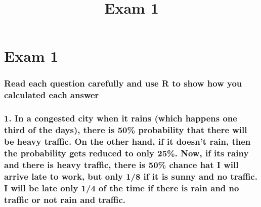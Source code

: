 \documentclass[11pt]{article}
\title{Exam 1}
\begin{document}
    
    
    \maketitle
    
    

    
    \hypertarget{exam-1}{%
\section{Exam 1}\label{exam-1}}

\hypertarget{read-each-question-carefully-and-use-r-to-show-how-you-calculated-each-answer}{%
\subsubsection{Read each question carefully and use R to show how you
calculated each
answer}\label{read-each-question-carefully-and-use-r-to-show-how-you-calculated-each-answer}}

    \hypertarget{in-a-congested-city-when-it-rains-which-happens-one-third-of-the-days-there-is-50-probability-that-there-will-be-heavy-traffic.-on-the-other-hand-if-it-doesnt-rain-then-the-probability-gets-reduced-to-only-25.-now-if-its-rainy-and-there-is-heavy-traffic-there-is-50-chance-hat-i-will-arrive-late-to-work-but-only-18-if-it-is-sunny-and-no-traffic.-i-will-be-late-only-14-of-the-time-if-there-is-rain-and-no-traffic-or-not-rain-and-traffic.}{%
\subsubsection{1. In a congested city when it rains (which happens one
third of the days), there is 50\% probability that there will be heavy
traffic. On the other hand, if it doesn't rain, then the probability
gets reduced to only 25\%. Now, if its rainy and there is heavy traffic,
there is 50\% chance hat I will arrive late to work, but only 1/8 if it
is sunny and no traffic. I will be late only 1/4 of the time if there is
rain and no traffic or not rain and
traffic.}\label{in-a-congested-city-when-it-rains-which-happens-one-third-of-the-days-there-is-50-probability-that-there-will-be-heavy-traffic.-on-the-other-hand-if-it-doesnt-rain-then-the-probability-gets-reduced-to-only-25.-now-if-its-rainy-and-there-is-heavy-traffic-there-is-50-chance-hat-i-will-arrive-late-to-work-but-only-18-if-it-is-sunny-and-no-traffic.-i-will-be-late-only-14-of-the-time-if-there-is-rain-and-no-traffic-or-not-rain-and-traffic.}}
\end{document}
